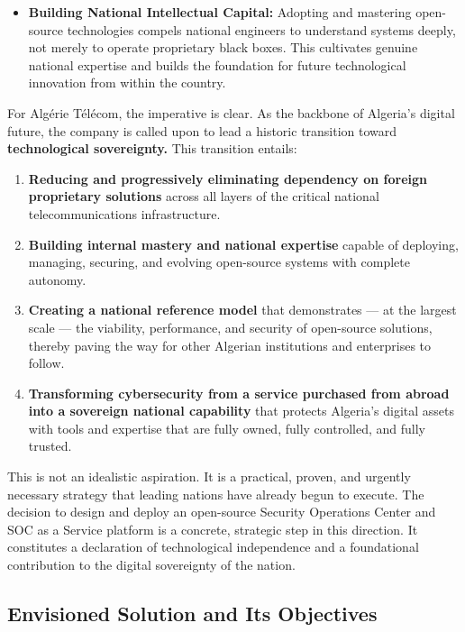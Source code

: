 \begin{itemize}
    \item \textbf{Building National Intellectual Capital:} \hspace{0.2cm} Adopting and mastering open-source technologies compels national engineers to understand systems deeply, not merely to operate proprietary black boxes. This cultivates genuine national expertise and builds the foundation for future technological innovation from within the country.
\end{itemize}

For Algérie Télécom, the imperative is clear. As the backbone of Algeria's digital future, the company is called upon to lead a historic transition toward \textbf{technological sovereignty.} This transition entails:

\begin{enumerate}
    \item \textbf{Reducing and progressively eliminating dependency on foreign proprietary solutions} across all layers of the critical national telecommunications infrastructure.
    \item \textbf{Building internal mastery and national expertise} capable of deploying, managing, securing, and evolving open-source systems with complete autonomy.
    \item \textbf{Creating a national reference model} that demonstrates — at the largest scale — the viability, performance, and security of open-source solutions, thereby paving the way for other Algerian institutions and enterprises to follow.
    \item \textbf{Transforming cybersecurity from a service purchased from abroad into a sovereign national capability} that protects Algeria's digital assets with tools and expertise that are fully owned, fully controlled, and fully trusted.
\end{enumerate}

This is not an idealistic aspiration. It is a practical, proven, and urgently necessary strategy that leading nations have already begun to execute. The decision to design and deploy an open-source Security Operations Center and SOC as a Service platform is a concrete, strategic step in this direction. It constitutes a declaration of technological independence and a foundational contribution to the digital sovereignty of the nation.

\subsection{Envisioned Solution and Its Objectives}
\label{subsec:solution}

